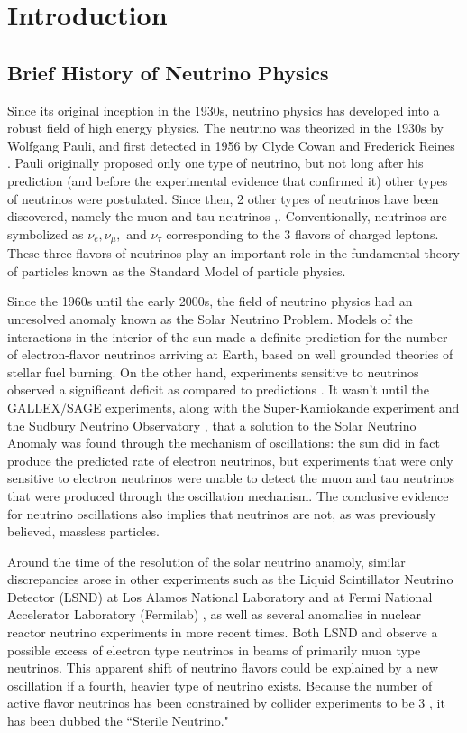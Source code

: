 
\chapter{Introduction}

\section{Brief History of Neutrino Physics}


Since its original inception in the 1930s, neutrino physics has developed into a robust field of high energy physics.  The neutrino was theorized in the 1930s by Wolfgang Pauli, and first detected in 1956 by Clyde Cowan and Frederick Reines \cite{cowanReines}.   Pauli originally proposed only one type of neutrino, but not long after his prediction (and before the experimental evidence that confirmed it) other types of neutrinos were postulated.   Since then, 2 other types of neutrinos have been discovered, namely the muon and tau neutrinos \cite{muon_neutrino},\cite{tau_neutrino}.  Conventionally, neutrinos are symbolized as $\nu_e, \nu_\mu,$ and $\nu_\tau$ corresponding to the 3 flavors of charged leptons.  These three flavors of neutrinos play an important role in the fundamental theory of particles known as the Standard Model of particle physics.

Since the 1960s until the early 2000s, the field of neutrino physics had an unresolved anomaly known as the Solar Neutrino Problem.  Models of the interactions in the interior of the sun made a definite prediction for the number of electron-flavor neutrinos arriving at Earth, based on well grounded theories of stellar fuel burning.  On the other hand, experiments sensitive to neutrinos observed a significant deficit as compared to predictions \cite{davis}.  It wasn't until the GALLEX/SAGE \cite{gallex}\cite{sage} experiments, along with the Super-Kamiokande experiment \cite{superK} and the Sudbury Neutrino Observatory \cite{SNO}, that a solution to the Solar Neutrino Anomaly was found through the mechanism of oscillations: the sun did in fact produce the predicted rate of electron neutrinos, but experiments that were only sensitive to electron neutrinos were unable to detect the muon and tau neutrinos that were produced through the oscillation mechanism.  The conclusive evidence for neutrino oscillations also implies that neutrinos are not, as was previously believed, massless particles.




Around the time of the resolution of the solar neutrino anamoly, similar discrepancies arose in other experiments such as the Liquid Scintillator Neutrino Detector (LSND) at Los Alamos National Laboratory \cite{lsnd} and \MB at Fermi National Accelerator Laboratory (Fermilab) \cite{mbcomb}, as well as several anomalies in nuclear reactor neutrino experiments in more recent times.  Both LSND and \MB observe a possible excess of electron type neutrinos in beams of primarily muon type neutrinos.  This apparent shift of neutrino flavors could be explained by a new oscillation if a fourth, heavier type of neutrino exists.  Because the number of active flavor neutrinos has been constrained by collider experiments to be 3 \cite{lep}, it has been dubbed the ``Sterile Neutrino."

